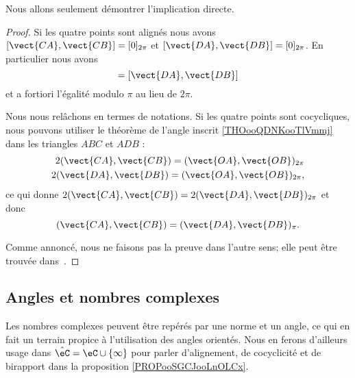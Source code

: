 Nous allons seulement démontrer l'implication directe.
\begin{proof}
    Si les quatre points sont alignés nous avons \( [\vect{ CA },\vect{ CB }]=[0]_{2\pi}\) et \( [\vect{ DA },\vect{ DB }]=[0]_{2\pi}\). En particulier nous avons
    \begin{equation}
        [\vect{ CA },\vect{ CB }]=[\vect{ DA },\vect{ DB }]
    \end{equation}
    et a fortiori l'égalité modulo \( \pi\) au lieu de \( 2\pi\).

    Nous nous relâchons en termes de notations. Si les quatre points sont cocycliques, nous pouvons utiliser le théorème de l'angle inscrit \ref{THOooQDNKooTlVmmj} dans les triangles \( ABC\) et \( ADB\) :
    \begin{subequations}
        \begin{align}
            2(\vect{ CA },\vect{ CB })=(\vect{ OA },\vect{ OB })_{2\pi}\\
            2(\vect{ DA },\vect{ DB })=(\vect{ OA },\vect{ OB })_{2\pi},
        \end{align}
    \end{subequations}
    ce qui donne \(  2(\vect{ CA },\vect{ CB })=2(\vect{ DA },\vect{ DB })_{2\pi}  \) et donc
    \begin{equation}
        (\vect{ CA },\vect{ CB })=(\vect{ DA },\vect{ DB })_{\pi}.
    \end{equation}

    Comme annoncé, nous ne faisons pas la preuve dans l'autre sens; elle peut être trouvée dans~\cite{ooRGSCooNgALYH}.
\end{proof}

\subsection{Angles et nombres complexes}
\label{SUBSECooKNUVooUBKaWm}

Les nombres complexes peuvent être repérés par une norme et un angle, ce qui en fait un terrain propice à l'utilisation des angles orientés. Nous en ferons d'ailleurs usage dans \( \hat\eC=\eC\cup\{ \infty \}\) pour parler d'alignement, de cocyclicité et de birapport dans la proposition \ref{PROPooSGCJooLnOLCx}.

